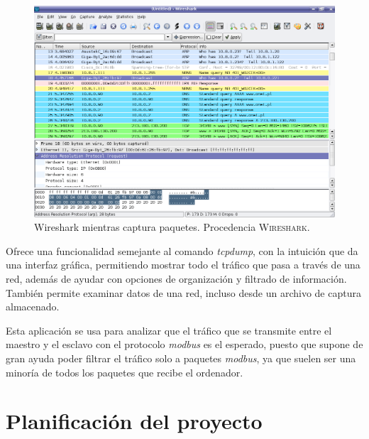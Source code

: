 \documentclass[pdftex,11pt,a4paper]{book}
\begin{document}
\begin{figure}[h]
\begin{center}
\includegraphics[width=\textwidth]{img/wireshark}
\caption{\label{vireshark}Wireshark mientras captura paquetes. Procedencia \textsc{Wireshark}\cite{wireshark}.}
\end{center}
\end{figure}

Ofrece una funcionalidad semejante al comando \emph{tcpdump}, con la intuición que da una interfaz gráfica, permitiendo mostrar todo el tráfico que pasa a través de una red, además de ayudar con opciones de organización y filtrado de información. También permite examinar datos de una red, incluso desde un archivo de captura almacenado.

Esta aplicación se usa para analizar que el tráfico que se transmite entre el maestro y el esclavo con el protocolo \emph{modbus} es el esperado, puesto que supone de gran ayuda poder filtrar el tráfico solo a paquetes \emph{modbus}, ya que suelen ser una minoría de todos los paquetes que recibe el ordenador.

\chapter{Planificación del proyecto}
\end{document}
